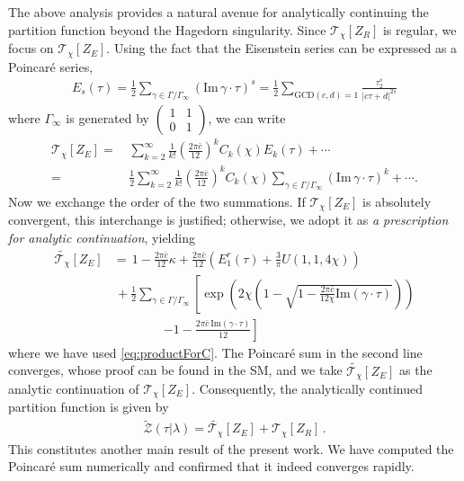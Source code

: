 \documentclass[aps,twocolumn,prl,showpacs,amsmath,amssymb,10pt]{revtex4-2}
\def\tc{\bar{c}}
\begin{document}
\vspace{0.3cm}
  The above analysis provides a natural avenue for analytically continuing the partition function beyond the Hagedorn singularity. Since $\mathcal{T}_{\chi}[Z_R]$ is regular, we focus on $\mathcal{T}_{\chi}[Z_E]$. Using the fact that the Eisenstein series can be expressed as a Poincar\'e series,
\begin{align}
E_s(\tau)=\frac{1}{2}\sum_{\gamma\in \Gamma/\Gamma_{\infty}}(\text{Im}\,\gamma\cdot\tau)^s=\frac{1}{2}\sum_{\text{GCD}(c,d)=1}\frac{\tau_2^s}{|c\tau+d|^{2s}}
\end{align}
where $\Gamma_{\infty}$ is generated by $\left(\begin{array}{ll}1 & 1 \\ 0 & 1\end{array}\right)$,
we can write
\begin{align}
\mathcal{T}_{\chi}[Z_E]=&\,\sum_{k=2}^{\infty}\frac{1}{k!}\left(\frac{2\pi \tc}{12}\right)^kC_k(\chi) E_k(\tau)+\cdots\\\nonumber
=&\,\frac{1}{2}\sum_{k=2}^{\infty}\frac{1}{k!}\left(\frac{2\pi \tc}{12}\right)^kC_k(\chi) \sum_{\gamma\in\Gamma/\Gamma_{\infty}}(\text{Im}\,\gamma\cdot\tau)^k+\cdots .
\end{align}
Now we exchange the order of the two summations. If $\mathcal{T}_{\chi}[Z_E]$ is absolutely convergent, this interchange is justified; otherwise, we adopt it as \emph{a prescription for analytic continuation}, yielding
\begin{align}
\widetilde{\mathcal{T}_{\chi}}[Z_E]&=\,1-\frac{2\pi \tc}{12}\kappa+\frac{2\pi \tc}{12}\left(E_1^r(\tau)+\frac{3}{\pi}U(1,1,4\chi) \right)\nonumber\\
&\,+\frac{1}{2}\sum_{\gamma\in\Gamma/\Gamma_{\infty}}\left[\exp\left(2\chi\left(1-\sqrt{1-\frac{2\pi \tc}{12\chi}\text{Im}(\gamma\cdot\tau)} \right)\right)\right.\nonumber\\
&\qquad\qquad\left. -1-\frac{2\pi \tc\,\text{Im}(\gamma\cdot\tau)}{12}\right]
\label{eq:TZE}
\end{align}
where we have used \eqref{eq:productForC}. The Poincar\'e sum in the second line converges, whose proof can be found in the SM, and we take $\widetilde{\mathcal{T}_{\chi}} [Z_E]$ as the analytic continuation of ${\mathcal{T}_{\chi}}[Z_E]$. Consequently, the analytically continued partition function is given by
\begin{align}
\widetilde{\mathcal{Z}}(\tau|\lambda)=\widetilde{\mathcal{T}_{\chi}}[Z_E]+\mathcal{T}_{\chi}[Z_R]\,.
\end{align}
This constitutes another main result of the present work. We have computed the Poincar\'e sum numerically and confirmed that it indeed converges rapidly.
\end{document}

